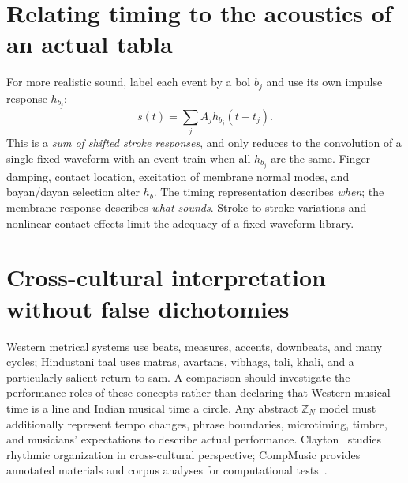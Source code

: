 \documentclass[11pt,letterpaper]{article}
\newcommand{\Z}{\mathbb Z}\newcommand{\R}{\mathbb R}\newcommand{\dd}{\mathrm d}\newcommand{\F}{\mathcal F}
\begin{document}
\section{Relating timing to the acoustics of an actual tabla}
For more realistic sound, label each event by a bol $b_j$ and use its own impulse response $h_{b_j}$:
\begin{equation}\boxed{s(t)=\sum_j A_jh_{b_j}(t-t_j).}\label{eq:audio}\end{equation}
This is a \emph{sum of shifted stroke responses}, and only reduces to the convolution of a single fixed waveform with an event train when all $h_{b_j}$ are the same. Finger damping, contact location, excitation of membrane normal modes, and bayan/dayan selection alter $h_b$. The timing representation describes \emph{when}; the membrane response describes \emph{what sounds}. Stroke-to-stroke variations and nonlinear contact effects limit the adequacy of a fixed waveform library.

\section{Cross-cultural interpretation without false dichotomies}
Western metrical systems use beats, measures, accents, downbeats, and many cycles; Hindustani taal uses matras, avartans, vibhags, tali, khali, and a particularly salient return to sam. A comparison should investigate the performance roles of these concepts rather than declaring that Western musical time is a line and Indian musical time a circle. Any abstract $\Z_N$ model must additionally represent tempo changes, phrase boundaries, microtiming, timbre, and musicians' expectations to describe actual performance. Clayton~\cite{clayton} studies rhythmic organization in cross-cultural perspective; CompMusic provides annotated materials and corpus analyses for computational tests~\cite{compmusic,corpus}.
\end{document}
